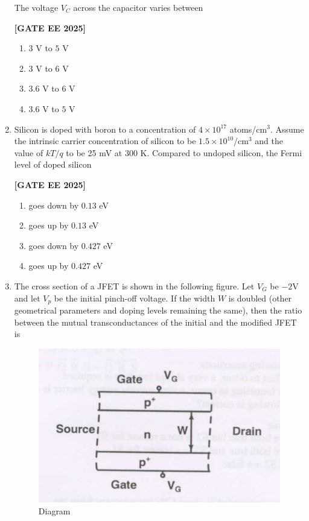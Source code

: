 \documentclass[12pt]{article}
\begin{document}
\begin{enumerate}[leftmargin=*, label=\textbf{Q.\arabic*:}]
The voltage $V_C$ across the capacitor varies between
 
\noindent \textbf{[GATE EE 2025]}
\begin{multicols}{4}
\begin{enumerate}
    \item $3$ V to $5$ V
    \item $3$ V to $6$ V
    \item $3.6$ V to $6$ V
    \item $3.6$ V to $5$ V
\end{enumerate}
\end{multicols}

\item Silicon is doped with boron to a concentration of $4 \times 10^{17}$ atoms/cm$^3$. Assume the intrinsic carrier concentration of silicon to be $1.5\times10^{10}$/cm$^3$ and the value of $kT/q$ to be 25 mV at 300 K. Compared to undoped silicon, the Fermi level of doped silicon
 
\noindent \textbf{[GATE EE 2025]}
\begin{multicols}{2}
\begin{enumerate}
    \item goes down by $0.13$ eV
    \item goes up by $0.13$ eV
    \item goes down by $0.427$ eV
    \item goes up by $0.427$ eV
\end{enumerate}
\end{multicols}

\item The cross section of a JFET is shown in the following figure. Let $V_G$ be $-2$V and let $V_p$ be the initial pinch-off voltage. If the width $W$ is doubled (other geometrical parameters and doping levels remaining the same), then the ratio between the mutual transconductances of the initial and the modified JFET is

\begin{figure}[H]\centering
\includegraphics[width=0.5\columnwidth]{figs/q52.png}
\caption{Diagram}
\label{fig:q52}
\end{figure}
 

\end{enumerate}
\end{document}
